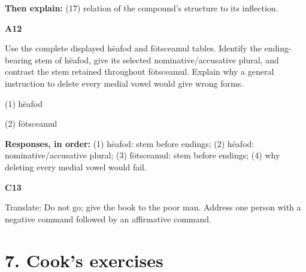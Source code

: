 \begin{minipage}{\linewidth}
\textbf{Then explain:} (17) relation of the compound’s structure to its inflection.

\end{minipage}\par\addvspace{4pt}

\par\begin{minipage}{\linewidth}\raggedright
\textbf{A12}

Use the complete displayed hēafod and fōtsceamul tables. Identify the ending-bearing stem of hēafod, give its selected nominative/\allowbreak{}accusative plural, and contrast the stem retained throughout fōtsceamul. Explain why a general instruction to delete every medial vowel would give wrong forms.

(1) hēafod

(2) fōtsceamul

\textbf{Responses, in order:} (1) hēafod: stem before endings; (2) hēafod: nominative/\allowbreak{}accusative plural; (3) fōtsceamul: stem before endings; (4) why deleting every medial vowel would fail.

\end{minipage}\par\addvspace{4pt}

\par\begin{minipage}{\linewidth}\raggedright
\textbf{C13}

Translate: Do not go; give the book to the poor man. Address one person with a negative command followed by an affirmative command.

\end{minipage}\par\addvspace{4pt}

\section*{7. Cook’s exercises}

